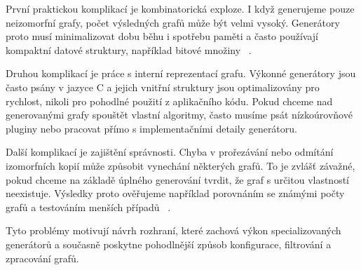 První praktickou komplikací je kombinatorická exploze. I když generujeme pouze neizomorfní grafy,
počet výsledných grafů může být velmi vysoký. Generátory proto musí
minimalizovat dobu běhu i spotřebu paměti a často používají kompaktní datové
struktury, například bitové množiny
~\cite[Section~2.3.1]{jooken2025computerassisted}.

Druhou komplikací je práce s interní reprezentací grafu. Výkonné generátory
jsou často psány v jazyce C a jejich vnitřní struktury jsou optimalizovány pro
rychlost, nikoli pro pohodlné použití z aplikačního kódu. Pokud chceme nad
generovanými grafy spouštět vlastní algoritmy, často musíme psát nízkoúrovňové
pluginy nebo pracovat přímo s implementačními detaily generátoru.

Další komplikací je zajištění správnosti. Chyba v prořezávání nebo odmítání
izomorfních kopií může způsobit vynechání některých grafů. To je zvlášť
závažné, pokud chceme na základě úplného generování tvrdit, že graf s určitou
vlastností neexistuje. Výsledky proto ověřujeme například porovnáním se známými
počty grafů a testováním menších případů
~\cite[Section~2.3.2]{jooken2025computerassisted}.

Tyto problémy motivují návrh rozhraní, které zachová výkon specializovaných
generátorů a současně poskytne pohodlnější způsob konfigurace, filtrování
a zpracování grafů.
